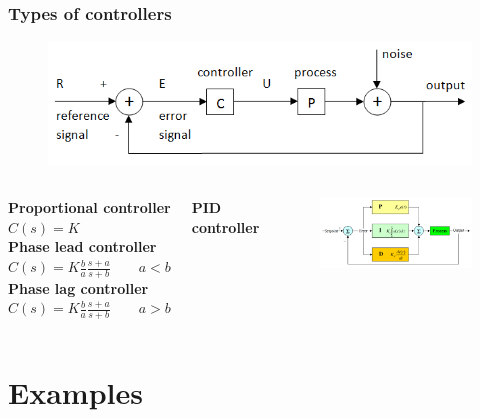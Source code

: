 \documentclass{beamer}
\begin{document}
\begin{frame}
\frametitle{Types of controllers}

\vspace{-4ex}
\begin{figure}
\includegraphics[width=.9\linewidth]{control_theory}
\end{figure}
\vspace{-4ex}
\begin{columns}[c]

\textbf{Proportional controller}\\
$C(s) = K$\\
\medskip
\textbf{Phase lead controller}\\
$C(s) = K \frac{b}{a} \frac{s+a}{s+b} \qquad a<b$\\
\medskip
\textbf{Phase lag controller}\\
$C(s) = K \frac{b}{a} \frac{s+a}{s+b} \qquad a>b$


\center \textbf{PID controller}\\
\begin{figure}
\includegraphics[width=1\linewidth]{PID}
\end{figure}

\end{columns}

\end{frame}

\section{Examples}
\end{document}
